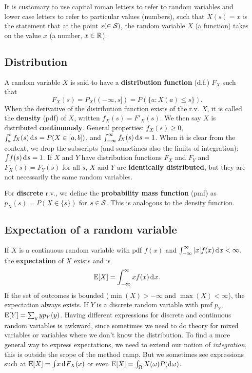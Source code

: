 \documentclass[10pt]{article}
\begin{document}
It is customary to use capital roman letters to refer to random variables and
lower case letters to refer to particular values (numbers), such that $X(s)=x$
is the statement that at the point $s(\in\mathcal{S})$, the random variable $X$ 
(a function) takes on the value $x$ (a number, $x\in\mathbb{R}$).

\subsection{Distribution}
A random variable $X$ is said to have a \textbf{distribution function} (d.f.) $F_X$
such that \[ F_X(s) = P_X((-\infty, s])=P(\{a: X(a)\leq s\}).\] When the derivative of the
distribution function exists of the r.v. $X$, it is called the \textbf{density} (pdf) of $X$, written
$f_{\!X}(s)=F'_X(s)$. We then say $X$ is distributed \textbf{continuously}. General
properties: $f_{\!X}(s)\geq0$, $\int_a^b f_{\!X}(s)\rd s = P(X\in[a,b])$, and
$\int_{-\infty}^\infty f_{\!X}(s) \rd s = 1$. When it is clear from the context, we drop the
subscripts (and sometimes also the limits of integration): $\int\! f(s)\rd s=1$.
If $X$ and $Y$ have distribution functions $F_X$ and $F_Y$ and $F_X(s)=F_Y(s)$ for all
$s$, $X$ and $Y$ are \textbf{identically distributed}, but they are not necessarily the
same random variables.

For \textbf{discrete} r.v., we define the \textbf{probability mass function} (pmf) as
$p_X(s) = P(X\in\{s\})$ for $s\in\mathcal{S}$. This is analogous to the density function.

\subsection{Expectation of a random variable}
If $X$ is a continuous random variable
with pdf $f(x)$ and 
\(\int_{-\infty}^\infty |x|f(x) \rd x < \infty,\)
the \textbf{expectation} of $X$ exists and is  
\[\E[X] = \int_{-\infty}^\infty xf(x) \rd x.\]
If the set of outcomes is bounded ($\min(X)> -\infty$ and $\max(X) < \infty$), 
the expectation always exists.
If $Y$ is a discrete random variable with pmf $p_Y$, 
$\operatorname{E}[Y]=\sum_y yp_Y(y)$. 
Having different expressions for discrete and continuous random variables is awkward, since
sometimes we need to do theory for mixed variables or variables where we don't know the 
distribution. To find a more general way to express expectations, we need to extend
our notion of \emph{integration}, this is outside the scope of the method camp. But we sometimes
see expressions such at $\E[X]=\int\! x \rd F_X(x)$
or even $\E[X]=\int_\Omega X(\omega) P(\rd \omega)$.
\end{document}
